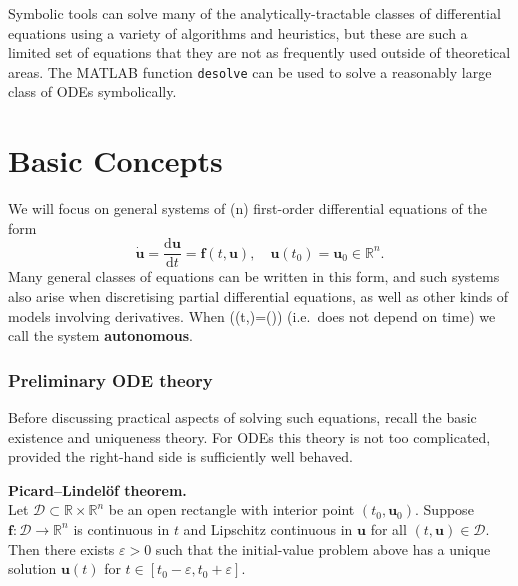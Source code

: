 \documentclass[
  letterpaper,
  DIV=11,
  numbers=noendperiod]{scrreprt}
\newenvironment{fbxSimple}[3]{\begin{tcolorbox}[enhanced, breakable,%
attach boxed title to top*={xshift=1.4pt},
boxed title style={boxrule=0.0mm, fuzzy shadow={1pt}{-1pt}{0mm}{0.1mm}{gray}, arc=.3em, rounded corners=east, sharp corners=west}, colframe=#1-color2, colbacktitle=#1-color1, colback = white, coltitle=black,  titlerule=0mm, toprule=0pt, bottomrule=.7pt, leftrule=.3em, rightrule=.7pt, outer arc=.3em,  	left=.5em, right=.5em, bottomtitle=1mm, toptitle=1mm,title=\textbf{#2}\hspace{0.5em}{#3}]}
{\end{tcolorbox}}
\begin{document}
\begin{tcolorbox}[enhanced jigsaw, bottomrule=.15mm, colbacktitle=quarto-callout-note-color!10!white, breakable, arc=.35mm, coltitle=black, colback=white, bottomtitle=1mm, opacityback=0, title=\textcolor{quarto-callout-note-color}{\faInfo}\hspace{0.5em}{Note}, titlerule=0mm, toptitle=1mm, opacitybacktitle=0.6, colframe=quarto-callout-note-color-frame, leftrule=.75mm, rightrule=.15mm, left=2mm, toprule=.15mm]

Symbolic tools can solve many of the analytically-tractable classes of
differential equations using a variety of algorithms and heuristics, but
these are such a limited set of equations that they are not as
frequently used outside of theoretical areas. The MATLAB function
\texttt{desolve} can be used to solve a reasonably large class of ODEs
symbolically.

\end{tcolorbox}

\section{Basic Concepts}\label{basic-concepts}

We will focus on general systems of (n) first-order differential
equations of the form \[
\dot{\mathbf{u}} = \frac{\mathrm{d}\mathbf{u}}{\mathrm{d}t} = \mathbf{f}(t,\mathbf{u}), \quad \mathbf{u}(t_0)=\mathbf{u}_0 \in \mathbb{R}^n.
\] Many general classes of equations can be written in this form, and
such systems also arise when discretising partial differential
equations, as well as other kinds of models involving derivatives. When
((t,)=()) (i.e.~does not depend
on time) we call the system \textbf{autonomous}.

\subsubsection{Preliminary ODE theory}\label{preliminary-ode-theory}

Before discussing practical aspects of solving such equations, recall
the basic existence and uniqueness theory. For ODEs this theory is not
too complicated, provided the right-hand side is sufficiently well
behaved.

\label{theorem-5.1}
\begin{fbxSimple}{theorem}{Theorem 5.1}{}
\label{theorem-5.1}
\textbf{Picard--Lindelöf theorem.}\\
Let \(\mathcal{D}\subset\mathbb{R}\times\mathbb{R}^n\) be an open
rectangle with interior point \((t_0,\mathbf{u}_0)\). Suppose
\(\mathbf{f}:\mathcal{D}\to\mathbb{R}^n\) is continuous in \(t\) and
Lipschitz continuous in \(\mathbf{u}\) for all
\((t,\mathbf{u})\in\mathcal{D}\). Then there exists \(\varepsilon>0\)
such that the initial-value problem above has a unique solution
\(\mathbf{u}(t)\) for \(t\in[t_0-\varepsilon,t_0+\varepsilon]\).

\end{fbxSimple}
\end{document}

